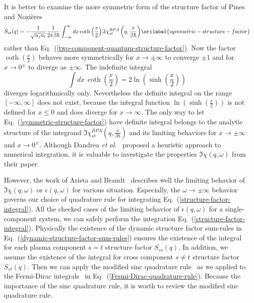\documentclass[aps,showkeys,noshowpacs,superscriptaddress,pre,preprint]{revtex4-2}
\let\label\orilabel
\begin{document}
It is better to examine the more symmetric form of the structure factor of Pines and Nozi\`eres~\cite{Pines-Nozieres1989}
\begin{equation}
{S_{st} ( q )} = - \frac{1}{\sqrt{ n_s n_t }} \frac{1}{2 \pi \beta \hbar}
\int_{-\infty}^{\infty} dx \, {\coth \left( \frac{x}{2} \right)}  
{\Im \chi^{RPA}_{st}  \left( q, \frac{x}{\beta\hbar} \right) }
\label{symmetric-structure-factor}
\end{equation}
rather than Eq.~(\ref{two-component-quantum-structure-factor}).
Now the factor ${\coth \left( \frac{x}{2} \right)}$ behaves more symmetrically
for $x \rightarrow \pm \infty$ to converge $\pm 1$
and for $x \rightarrow 0^{\pm}$ to diverge as $\pm \infty$.
The indefinite integral 
\begin{equation*}
\int dx \, {\coth \left( \frac{x}{2} \right)} = 2 {\ln \left( \sinh \left( \frac{x}{2} \right) \right)}
\end{equation*}
diverges logarithmically only.
Nevertheless the definite integral on the range $\left[ -\infty, \infty \right]$ does not exist,
because the integral function ${\ln \left( \sinh \left( \frac{x}{2} \right) \right)}$ 
is not defined for $ x \le 0$ and does diverge for $x \rightarrow \infty$.
The only way to let Eq.~(\ref{symmetric-structure-factor}) have definite integral
belongs to the analytic structure of 
the integrand ${\Im \chi^{RPA}_{st} \left( q, \frac{x}{\beta\hbar} \right) }$
and its limiting behaviors for $x \rightarrow \pm \infty$ and $x \rightarrow 0^\pm$.
Although Dandrea \textit{et al.}~\cite{Dandrea1986} proposed a heuristic approach to numerical integration,
it is valuable to investigate the properties ${\Im \chi \left( q, \omega \right) }$ from their paper.

However, the work of Arista and Brandt~\cite{Arista-Brandt1984}
describes well the limiting behavior of ${\Im \chi \left( q, \omega \right) }$ or ${\epsilon \left( q, \omega \right)}$ for various situation.
Especially, the $\omega \rightarrow \pm \infty$ behavior governs our choice of quadrature rule 
for integrating Eq.~(\ref{structure-factor-integral}).
All the checked cases of the limiting behavior of ${\epsilon \left( q, \omega \right) }$ for a single-component system,
we can safely perform the integration Eq.~(\ref{structure-factor-integral}).
Physically the existence of the dynamic structure factor sum-rules in Eq.~(\ref{dynamic-structure-factor-sum-rules})
ensures the existence of the integral for each plasma component $s=t$ structure factor $S_{ss} (q)$.
In addition, we assume the existence of the integral for cross component $s \neq t$ structure factor $S_{st} (q)$.
Then we can apply the modified sinc quadrature rule~\cite{Bialecki1989} 
as we applied to the Fermi-Dirac integrals~\cite{Mohankumar-Natarajan1995,Mohankumar-Natarajan1996}
in Eq.~(\ref{Fermi-Dirac-quadrature-rule}).
Because the importance of the sinc quadrature rule,
it is worth to review the modified sinc quadrature rule.
\end{document}

